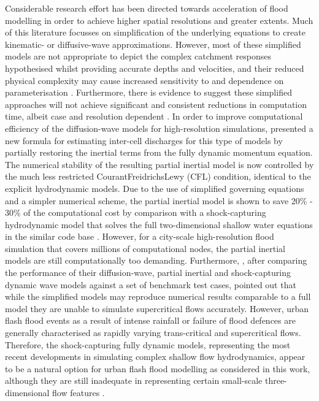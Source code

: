 \documentclass[11pt,english,a4paper]{article}
\begin{document}
Considerable research effort has been directed towards acceleration of flood modelling in order to achieve higher spatial resolutions and greater extents. Much of this literature focusses on simplification of the underlying equations to create kinematic- or diffusive-wave approximations. However, most of these simplified models are not appropriate to depict the complex catchment responses hypothesised whilst providing accurate depths and velocities, and their reduced physical complexity may cause increased sensitivity to and dependence on parameterisation \citep{Costabile2009,Costabile2012,Fewtrell2011a,Yeh2011}. Furthermore, there is evidence to suggest these simplified approaches will not achieve significant and consistent reductions in computation time, albeit case and resolution dependent \citep{Hunter2007,Pender2010,Wang2011a}. In order to improve computational efficiency of the diffusion-wave models for high-resolution simulations, \citet{Bates2010} presented a new formula for estimating inter-cell discharges for this type of models by partially restoring the inertial terms from the fully dynamic momentum equation. The numerical stability of the resulting partial inertial model is now controlled by the much less restricted Courant\textendash Freidrichs\textendash Lewy (CFL) condition, identical to the explicit hydrodynamic models. Due to the use of simplified governing equations and a simpler numerical scheme, the partial inertial model is shown to save 20\% - 30\% of the computational cost by comparison with a shock-capturing hydrodynamic model that solves the full two-dimensional shallow water equations in the similar code base \citep{Zhang2014}. However, for a city-scale high-resolution flood simulation that covers millions of computational nodes, the partial inertial models are still computationally too demanding. Furthermore, \citet{Neal2012}, after comparing the performance of their diffusion-wave, partial inertial and shock-capturing dynamic wave models against a set of benchmark test cases, pointed out that while the simplified models may reproduce numerical results comparable to a full model they are unable to simulate supercritical flows accurately. However, urban flash flood events as a result of intense rainfall or failure of flood defences are generally characterised as rapidly varying trans-critical and supercritical flows. Therefore, the shock-capturing fully dynamic models, representing the most recent developments in simulating complex shallow flow hydrodynamics, appear to be a natural option for urban flash flood modelling as considered in this work, although they are still inadequate in representing certain small-scale three-dimensional flow features \citep{Soares-Frazao2008,Guinot2012}. 
\end{document}
